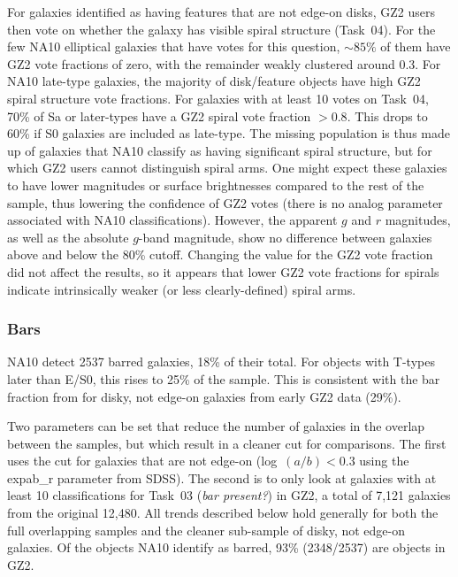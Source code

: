\documentclass[useAMS,usenatbib]{mn2e}
\begin{document}
For galaxies identified as having features that are not edge-on disks, GZ2 users then vote on whether the galaxy has visible spiral structure (Task~04). For the few NA10 elliptical galaxies that have votes for this question, $\sim85\%$ of them have GZ2 vote fractions of zero, with the remainder weakly clustered around 0.3. For NA10 late-type galaxies, the majority of disk/feature objects have high GZ2 spiral structure vote fractions. For galaxies with at least 10 votes on Task~04, 70\% of Sa or later-types have a GZ2 spiral vote fraction $>0.8$. This drops to 60\% if S0 galaxies are included as late-type. The missing population is thus made up of galaxies that NA10 classify as having significant spiral structure, but for which GZ2 users cannot distinguish spiral arms. One might expect these galaxies to have lower magnitudes or surface brightnesses compared to the rest of the sample, thus lowering the confidence of GZ2 votes (there is no analog parameter associated with NA10 classifications). However, the apparent $g$ and $r$ magnitudes, as well as the absolute $g$-band magnitude, show no difference between galaxies above and below the 80\% cutoff. Changing the value for the GZ2 vote fraction did not affect the results, so it appears that lower GZ2 vote fractions for spirals indicate intrinsically weaker (or less clearly-defined) spiral arms.

\subsubsection{Bars}

NA10 detect 2537 barred galaxies, 18\% of their total. For objects with T-types later than E/S0, this rises to 25\% of the sample. This is consistent with the bar fraction from \citep{mas11c} for disky, not edge-on galaxies from early GZ2 data (29\%). 

Two parameters can be set that reduce the number of galaxies in the overlap between the samples, but which result in a cleaner cut for comparisons. The first uses the \citet{mas11c} cut for galaxies that are not edge-on (log~$(a/b) < 0.3$ using the {\sc expab\_r} parameter from SDSS). The second is to only look at galaxies with at least 10 classifications for Task~03 ({\it bar present?}) in GZ2, a total of 7,121 galaxies from the original 12,480. All trends described below hold generally for both the full overlapping samples and the cleaner sub-sample of disky, not edge-on galaxies. Of the objects NA10 identify as barred, 93\% (2348/2537) are objects in GZ2. 
\end{document}
